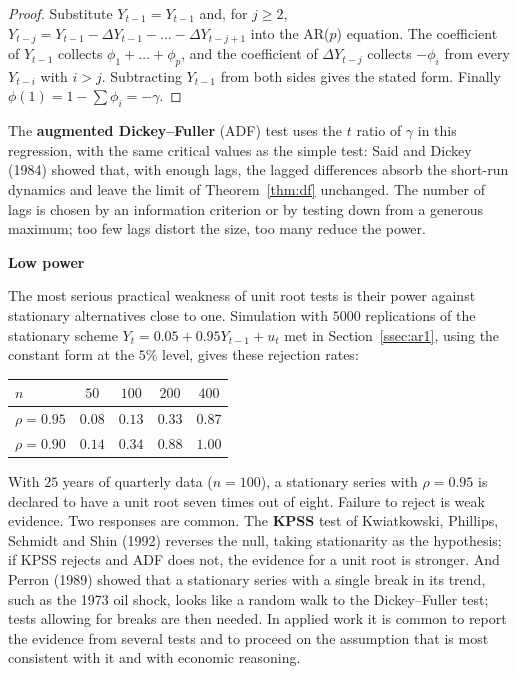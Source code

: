 \documentclass[11pt,a4paper]{article}
\numberwithin{equation}{section}
\theoremstyle{definition}
\newcommand{\subhead}[1]{%
  \par\medskip\noindent\textbf{#1}\par\nobreak\smallskip}
\begin{document}
\begin{proof}
Substitute $Y_{t-1} = Y_{t-1}$ and, for $j \geq 2$, $Y_{t-j} = Y_{t-1} - \Delta Y_{t-1} - \dots - \Delta Y_{t-j+1}$ into the AR($p$) equation. The coefficient of $Y_{t-1}$ collects $\phi_1 + \dots + \phi_p$,
and the coefficient of $\Delta Y_{t-j}$ collects $-\phi_i$ from every $Y_{t-i}$ with $i > j$. Subtracting $Y_{t-1}$ from both sides gives the stated form. Finally
$\phi(1) = 1 - \sum\phi_i = -\gamma$.
\end{proof}

The \textbf{augmented Dickey--Fuller} (ADF) test uses the $t$ ratio of $\gamma$ in this regression, with the same critical values as the simple test: Said and Dickey
(1984) showed that, with enough lags, the lagged differences absorb the short-run dynamics and leave the limit of Theorem~\ref{thm:df} unchanged. The
number of lags is chosen by an information criterion or by testing down from a generous maximum; too few lags distort the size, too many reduce the
power.

\subhead{Low power}
The most serious practical weakness of unit root tests is their power against stationary alternatives close to one. Simulation with $5000$
replications of the stationary scheme $Y_t = 0.05 + 0.95Y_{t-1} + u_t$ met in Section~\ref{ssec:ar1}, using the constant form at the $5\%$ level, gives these rejection
rates:
\begin{center}
\renewcommand{\arraystretch}{1.3}
\begin{tabular}{lcccc}
\hline
$n$ & $50$ & $100$ & $200$ & $400$\\
\hline
$\rho = 0.95$ & $0.08$ & $0.13$ & $0.33$ & $0.87$\\
$\rho = 0.90$ & $0.14$ & $0.34$ & $0.88$ & $1.00$\\
\hline
\end{tabular}
\end{center}
With $25$ years of quarterly data ($n = 100$), a stationary series with $\rho = 0.95$ is declared to have a unit root seven times out of eight. Failure to reject
is weak evidence. Two responses are common. The \textbf{KPSS} test of Kwiatkowski, Phillips, Schmidt and Shin (1992) reverses the null, taking stationarity
as the hypothesis; if KPSS rejects and ADF does not, the evidence for a unit root is stronger. And Perron (1989) showed that a stationary series with a
single break in its trend, such as the 1973 oil shock, looks like a random walk to the Dickey--Fuller test; tests allowing for breaks are then needed.
In applied work it is common to report the evidence from several tests and to proceed on the assumption that is most consistent with it and with
economic reasoning.
\end{document}
